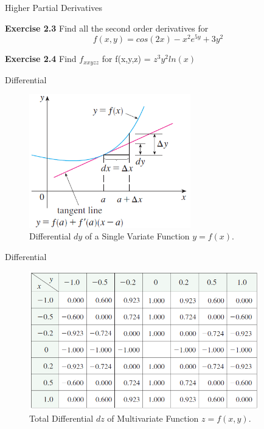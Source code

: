 \documentclass{beamer}
\begin{document}
    \begin{frame}[t]{Higher Partial Derivatives}
        \par \textbf{Exercise 2.3} Find all the second order derivatives for 
        \begin{equation*}
            f(x,y) = cos(2x) - x^2e^{5y} + 3y^2
        \end{equation*}
        \par \textbf{Exercise 2.4} Find $f_{xxyzz}$ for f(x,y,z) = $z^3y^2ln(x)$
    \end{frame}
    
    \begin{frame}{Differential}
        \begin{figure}
            \includegraphics[width = 7cm]{f10}
            \caption{Differential $dy$ of a Single Variate Function $y = f(x)$.}
        \end{figure}
    \end{frame}


    \begin{frame}{Differential}
        \begin{figure}
            \includegraphics[width = 10cm]{f6}
            \caption{Total Differential $dz$ of Multivariate Function $z = f(x,y)$.}
        \end{figure}
    \end{frame}
\end{document}
